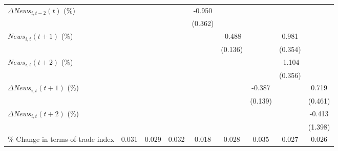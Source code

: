 {\begin{tabular}{l*{8}{c}}
\addlinespace
$ \Delta News_{i,t-2}(t)$ (\%)&                     &                     &                     &      -0.950\sym{***}&                     &                     &                     &                     \\
                    &                     &                     &                     &     (0.362)         &                     &                     &                     &                     \\
\addlinespace
$ News_{i,t}(t+1)$ (\%)&                     &                     &                     &                     &      -0.488\sym{***}&                     &       0.981\sym{***}&                     \\
                    &                     &                     &                     &                     &     (0.136)         &                     &     (0.354)         &                     \\
\addlinespace
$ News_{i,t}(t+2)$ (\%)&                     &                     &                     &                     &                     &                     &      -1.104\sym{***}&                     \\
                    &                     &                     &                     &                     &                     &                     &     (0.356)         &                     \\
\addlinespace
$ \Delta News_{i,t}(t+1)$ (\%)&                     &                     &                     &                     &                     &      -0.387\sym{***}&                     &       0.719         \\
                    &                     &                     &                     &                     &                     &     (0.139)         &                     &     (0.461)         \\
\addlinespace
$ \Delta News_{i,t}(t+2)$ (\%)&                     &                     &                     &                     &                     &                     &                     &      -0.413         \\
                    &                     &                     &                     &                     &                     &                     &                     &     (1.398)         \\
\addlinespace
\% Change in terms-of-trade index&       0.031\sym{**} &       0.029\sym{*}  &       0.032\sym{**} &       0.018         &       0.028\sym{*}  &       0.035\sym{**} &       0.027\sym{**} &       0.026\sym{*}  \\

\end{tabular}}

